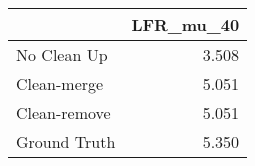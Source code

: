\begin{tabular}{lr}
\toprule
{} & LFR_mu_40 \\
\midrule
No Clean Up  &     3.508 \\
Clean-merge  &     5.051 \\
Clean-remove &     5.051 \\
Ground Truth &     5.350 \\
\bottomrule
\end{tabular}
